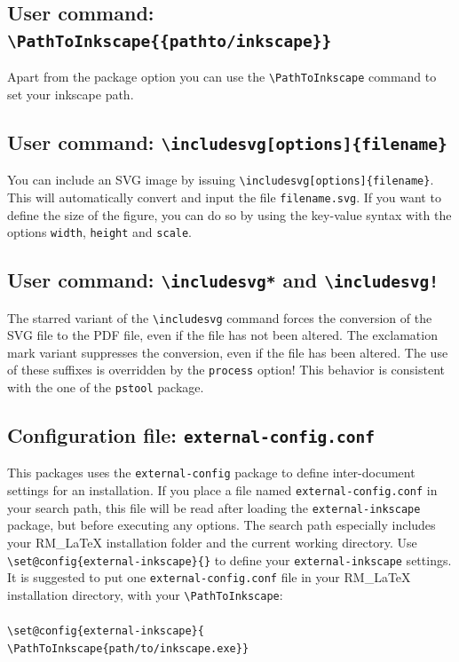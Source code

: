 \documentclass{article}
\let\otextbackslash\textbackslash
\renewcommand\textbackslash{{\rmfamily\otextbackslash}}
\begin{document}
\subsection{User command: \texttt{\textbackslash PathToInkscape\{\{pathto/inkscape\}\}}}
Apart from the package option you can use the \texttt{\textbackslash PathToInkscape} command to set your inkscape path.

\subsection{User command: \texttt{\textbackslash includesvg[options]\{filename\}}}
You can include an SVG image by issuing \texttt{\textbackslash includesvg[options]\{filename\}}. This will automatically convert and input the file \texttt{filename.svg}. If you want to define the size of the figure, you can do so by using the key-value syntax with the options \texttt{width}, \texttt{height} and \texttt{scale}.

\subsection{User command: \texttt{\textbackslash includesvg*} and \texttt{\textbackslash includesvg!}}
The starred variant of the \texttt{\textbackslash includesvg} command forces the conversion of the SVG file to the PDF file, even if the file has not been altered. The exclamation mark variant suppresses the conversion, even if the file has been altered. The use of these suffixes is overridden by the \texttt{process} option! This behavior is consistent with the one of the \texttt{pstool} package.

\subsection{Configuration file: \texttt{external-config.conf}}
This packages uses the \texttt{external-config} package to define inter-document settings for an installation. If you place a file named \texttt{external-config.conf} in your search path, this file will be read after loading the \texttt{external-inkscape} package, but before executing any options. The search path especially includes your RM\_LaTeX installation folder and the current working directory. Use \texttt{\textbackslash set@config\{external-inkscape\}\{<config commands>\}} to define your \texttt{external-inkscape} settings. It is suggested to put one \texttt{external-config.conf} file in your RM\_LaTeX installation directory, with your \texttt{\textbackslash PathToInkscape}: \\\\
\texttt{\textbackslash set@config\{external-inkscape\}\{ \\ 
\textbackslash PathToInkscape\{path/to/inkscape.exe\}\}}
\end{document}
